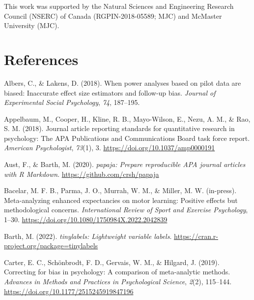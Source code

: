\documentclass[
  man, donotrepeattitle,mask,floatsintext]{apa7}
\newlength{\cslhangindent}
\newlength{\cslentryspacingunit} %
\newenvironment{CSLReferences}[2] %
 {%
  \setlength{\parindent}{0pt}
  \ifodd #1
  \let\oldpar\par
  \def\par{\hangindent=\cslhangindent\oldpar}
  \fi
  \setlength{\parskip}{#2\cslentryspacingunit}
 }%
 {}
\begin{document}
\noindent This work was supported by the Natural Sciences and Engineering Research Council (NSERC) of Canada (RGPIN-2018-05589; MJC) and McMaster University (MJC).

\pagebreak

\hypertarget{references}{%
\section{References}\label{references}}

\vspace{2ex}

\hypertarget{refs}{}
\begin{CSLReferences}{1}{0}
\leavevmode{}%
Albers, C., \& Lakens, D. (2018). When power analyses based on pilot data are biased: Inaccurate effect size estimators and follow-up bias. \emph{Journal of Experimental Social Psychology}, \emph{74}, 187--195.

\leavevmode{}%
Appelbaum, M., Cooper, H., Kline, R. B., Mayo-Wilson, E., Nezu, A. M., \& Rao, S. M. (2018). Journal article reporting standards for quantitative research in psychology: {The} {APA} {Publications} and {Communications} {Board} task force report. \emph{American Psychologist}, \emph{73}(1), 3. \url{https://doi.org/10.1037/amp0000191}

\leavevmode{}%
Aust, F., \& Barth, M. (2020). \emph{{papaja}: {Prepare} reproducible {APA} journal articles with {R Markdown}}. \url{https://github.com/crsh/papaja}

\leavevmode{}%
Bacelar, M. F. B., Parma, J. O., Murrah, W. M., \& Miller, M. W. (in-press). Meta-analyzing enhanced expectancies on motor learning: Positive effects but methodological concerns. \emph{International Review of Sport and Exercise Psychology}, 1--30. \url{https://doi.org/10.1080/1750984X.2022.2042839}

\leavevmode{}%
Barth, M. (2022). \emph{{tinylabels}: Lightweight variable labels}. \url{https://cran.r-project.org/package=tinylabels}

\leavevmode{}%
Carter, E. C., Schönbrodt, F. D., Gervais, W. M., \& Hilgard, J. (2019). Correcting for bias in psychology: A comparison of meta-analytic methods. \emph{Advances in Methods and Practices in Psychological Science}, \emph{2}(2), 115--144. \url{https://doi.org/10.1177/2515245919847196}


\end{CSLReferences}
\end{document}
